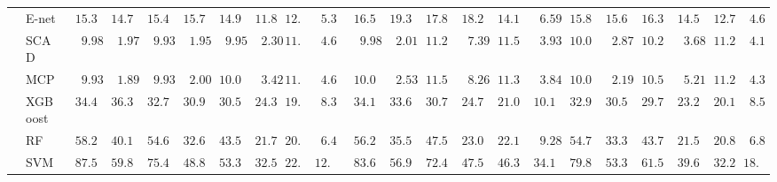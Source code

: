 \begin{tabular}{ll|ll|llllll|llllll|llllll}
 & E-net  & $\phantom{0}15.30$ & $\phantom{0}14.78$ & $\phantom{0}15.46$ & $\phantom{0}15.77$ & $\phantom{0}14.93$ & $\phantom{0}11.82$ & $12.78$ & $\phantom{0}5.38$ & $\phantom{0}16.55$ & $\phantom{0}19.35$ & $\phantom{0}17.81$ & $\phantom{0}18.20$ & $\phantom{0}14.13$ & $\phantom{00}6.59$ & $\phantom{0}15.82$ & $\phantom{0}15.60$ & $\phantom{0}16.30$ & $\phantom{0}14.58$ & $\phantom{0}12.76$ & $\phantom{0}4.69$ \\
 & SCAD  & $\phantom{00}9.98$ & $\phantom{00}1.97$ & $\phantom{00}9.93$ & $\phantom{00}1.95$ & $\phantom{00}9.95$ & $\phantom{00}2.30$ & $11.35$ & $\phantom{0}4.62$ & $\phantom{00}9.98$ & $\phantom{00}2.01$ & $\phantom{0}11.24$ & $\phantom{00}7.39$ & $\phantom{0}11.54$ & $\phantom{00}3.93$ & $\phantom{0}10.05$ & $\phantom{00}2.87$ & $\phantom{0}10.20$ & $\phantom{00}3.68$ & $\phantom{0}11.29$ & $\phantom{0}4.15$ \\
 & MCP  & $\phantom{00}9.93$ & $\phantom{00}1.89$ & $\phantom{00}9.93$ & $\phantom{00}2.00$ & $\phantom{0}10.08$ & $\phantom{00}3.42$ & $11.24$ & $\phantom{0}4.65$ & $\phantom{0}10.01$ & $\phantom{00}2.53$ & $\phantom{0}11.53$ & $\phantom{00}8.26$ & $\phantom{0}11.39$ & $\phantom{00}3.84$ & $\phantom{0}10.01$ & $\phantom{00}2.19$ & $\phantom{0}10.51$ & $\phantom{00}5.21$ & $\phantom{0}11.24$ & $\phantom{0}4.34$ \\
 & XGBoost  & $\phantom{0}34.43$ & $\phantom{0}36.33$ & $\phantom{0}32.74$ & $\phantom{0}30.92$ & $\phantom{0}30.59$ & $\phantom{0}24.33$ & $19.75$ & $\phantom{0}8.34$ & $\phantom{0}34.14$ & $\phantom{0}33.63$ & $\phantom{0}30.75$ & $\phantom{0}24.72$ & $\phantom{0}21.09$ & $\phantom{0}10.11$ & $\phantom{0}32.90$ & $\phantom{0}30.56$ & $\phantom{0}29.73$ & $\phantom{0}23.27$ & $\phantom{0}20.11$ & $\phantom{0}8.58$ \\
 & RF  & $\phantom{0}58.29$ & $\phantom{0}40.13$ & $\phantom{0}54.66$ & $\phantom{0}32.63$ & $\phantom{0}43.55$ & $\phantom{0}21.76$ & $20.08$ & $\phantom{0}6.47$ & $\phantom{0}56.25$ & $\phantom{0}35.54$ & $\phantom{0}47.58$ & $\phantom{0}23.00$ & $\phantom{0}22.17$ & $\phantom{00}9.28$ & $\phantom{0}54.79$ & $\phantom{0}33.39$ & $\phantom{0}43.74$ & $\phantom{0}21.58$ & $\phantom{0}20.86$ & $\phantom{0}6.82$ \\
 & SVM  & $\phantom{0}87.57$ & $\phantom{0}59.83$ & $\phantom{0}75.45$ & $\phantom{0}48.82$ & $\phantom{0}53.39$ & $\phantom{0}32.58$ & $22.97$ & $12.02$ & $\phantom{0}83.67$ & $\phantom{0}56.91$ & $\phantom{0}72.49$ & $\phantom{0}47.59$ & $\phantom{0}46.38$ & $\phantom{0}34.17$ & $\phantom{0}79.80$ & $\phantom{0}53.30$ & $\phantom{0}61.59$ & $\phantom{0}39.61$ & $\phantom{0}32.28$ & $18.95$ \\\hline

\end{tabular}
